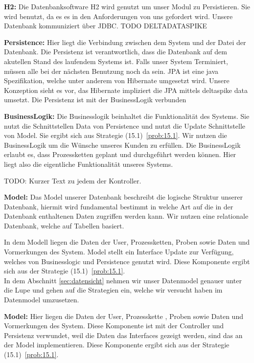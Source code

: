 \documentclass[enabledeprecatedfontcommands,fontsize=12pt,paper=a4,twoside]{scrartcl}
\begin{document}
{%
\textbf{H2:} Die Datenbanksoftware H2 wird genutzt um unser Modul zu
Persistieren. Sie wird benutzt, da es es in den Anforderungen von uns gefordert
wird. Unsere Datenbank kommuniziert über JDBC. TODO {DELTADATASPIKE}
}

{%
\textbf{Persistence:} Hier liegt die Verbindung zwischen dem System und der
Datei der Datenbank. Die Persistenz ist verantwortlich, dass die Datenbank auf
dem akutellen Stand des laufendem Systems ist. Falls unser System Terminiert,
müssen alle bei der nächsten Benutzung noch da sein. JPA ist eine java
Spezifikation, welche unter anderem von Hibernate umgesetzt wird. Unsere
Konzeption sieht es vor, das Hibernate impliziert die JPA mittels deltaspike data umsetzt.
Die Persistenz ist mit der BusinessLogik verbunden

}

{%
\textbf{BusinessLogik:} Die Businesslogik beinhaltet die Funktionalität des
Systems. Sie nutzt die Schnittstellen Data von Persistence und nutzt die Update
Schnittstelle von Model. Sie ergibt sich aus Strategie (15.1)~\ref{prob:15.1}.
Wir nutzen die BusinessLogik um die Wünsche unseres Kunden zu erfüllen. Die
BusinessLogik erlaubt es, dass Prozessketten geplant und durchgeführt werden
können. Hier liegt also die eigentliche Funktionalität unseres Systems.

TODO: Kurzer Text zu jedem der Kontroller.

}

{%
  \textbf{Model:} Das Model unserer Datenbank beschreibt die logische Struktur
  unserer Datenbank, hiermit wird fundamental bestimmt in welche Art auf die in
  der Datenbank enthaltenen Daten zugriffen werden kann. Wir nutzen eine
  relationale Datenbank, welche auf Tabellen basiert.

In dem Modell liegen die Daten der User, Prozessketten, Proben sowie
Daten und Vormerkungen des System. Model stellt ein Interface Update zur
Verfügung, welches von Businesslogic und Persistence genutzt wird. Diese
Komponente ergibt sich aus der Strategie (15.1)~\ref{prob:15.1}.\\
In dem Abschnitt \ref{sec:datensicht} nehmen wir unser Datenmodel genauer unter
die Lupe und gehen auf die Strategien ein, welche wir versucht haben im
Datenmodel umzusetzen.
}

\textbf{Model:} Hier liegen die Daten der User, Prozesskette , Proben sowie Daten und Vormerkungen des System. Diese Komponente ist mit der Controller und Persistenz verwundet, weil die Daten das Interfaces gezeigt werden, sind das an der Model implementieren. Diese Komponente ergibt sich aus der Strategie (15.1)~\ref{prob:15.1}. \\
\end{document}
